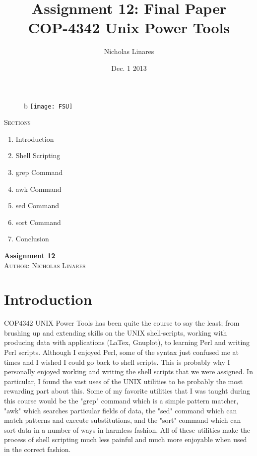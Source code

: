 \documentclass{article}
\begin{document}
  \title{Assignment 12: Final Paper \\ \large COP-4342 Unix Power Tools}     
  \author{Nicholas Linares}
  \date{Dec. 1 2013}
\maketitle 
\begin{centering}
\begin{figure}{b}
\centering
\texttt{[image: FSU]}
\end{figure}
\end{centering}
\newpage	

\begin{center}
\textsc{\LARGE Sections} \\[1.5cm]
\end{center}  
  \begin{enumerate}
    \item Introduction
    \item Shell Scripting
    \item grep Command
    \item awk Command
    \item sed Command
    \item sort Command
    \item Conclusion
  \end{enumerate}
\newpage

\begin{center}
	\textbf{\LARGE Assignment 12} \\[1.5cm]

	\textsc{\large Author: Nicholas Linares} \\[0.5cm]
	\maketitle
\end{center}

\section{Introduction}	
	COP4342 UNIX Power Tools has been quite the course to say the least; from brushing up and 
extending skills on the UNIX shell-scripts, working with producing data with applications (LaTex, 
Gnuplot), to learning Perl and writing Perl scripts. Although I enjoyed Perl, some of the syntax just 
confused me at times and I wished I could go back to shell scripts. This is probably why I personally 
enjoyed working and writing the shell scripts that we were assigned. In particular, I found the vast uses 
of the UNIX utilities to be probably the most rewarding part about this. Some of my favorite utilities that 
I was taught during this course would be the "grep" command which is a simple pattern matcher, "awk" 
which searches particular fields of data, the "sed" command which can match patterns and execute 
substitutions, and the "sort" command which can sort data in a number of ways in harmless fashion. All 
of these utilities make the process of shell scripting much less painful and much more enjoyable when 
used in the correct fashion.
\end{document}
